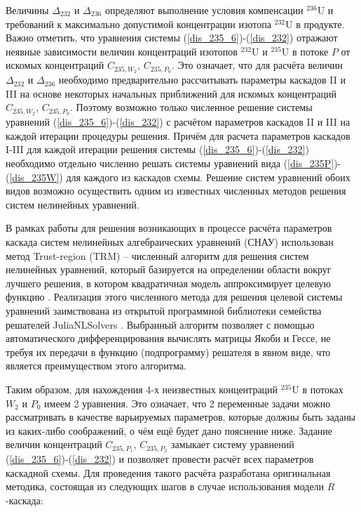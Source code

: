 Величины $\Delta_{232}$ и $\Delta_{236}$ определяют выполнение условия компенсации $^{236}$U и требований к максимально допустимой концентрации изотопа $^{232}$U в продукте. Важно отметить, что уравнения системы (\ref{dis_235_6})-(\ref{dis_232}) отражают неявные зависимости величин концентраций изотопов $^{232}$U и $^{235}$U в потоке $P$ от искомых концентраций $C_{235,{W_2}}$, $C_{235,{P_0}}$. Это означает, что для расчёта величин $\Delta_{232}$ и $\Delta_{236}$ необходимо предварительно рассчитывать параметры каскадов II и III на основе некоторых начальных приближений для искомых концентраций $C_{235,{W_2}}$, $C_{235,{P_0}}$. Поэтому возможно только численное решение системы уравнений (\ref{dis_235_6})-(\ref{dis_232}) с расчётом параметров каскадов II и III на каждой итерации процедуры решения. Причём для расчета параметров каскадов I-III для каждой итерации решения системы (\ref{dis_235_6})-(\ref{dis_232}) необходимо отдельно численно решать системы уравнений вида (\ref{dis_235P})-(\ref{dis_235W}) для каждого из каскадов схемы. Решение систем уравнений обоих видов возможно осуществить одним из известных численных методов решения систем нелинейных уравнений. 

В рамках работы для решения возникающих в процессе расчёта параметров каскада систем нелинейных алгебраических уравнений (СНАУ) использован метод Trust-region (TRM) -- численный алгоритм для решения систем нелинейных уравнений, который базируется на определении области вокруг лучшего решения, в котором квадратичная модель аппроксимирует целевую функцию \cite{NumericalOptimization2006}. Реализация этого численного метода для решения целевой системы уравнений заимствована из открытой программной библиотеки семейства решателей JuliaNLSolvers \cite{mogensenJuliaNLSolversNLsolveJl2020}. Выбранный алгоритм позволяет с помощью автоматического дифференцирования вычислять матрицы Якоби и Гессе, не требуя их передачи в функцию (подпрограмму) решателя в явном виде, что является преимуществом этого алгоритма.


Таким образом, для нахождения 4-х неизвестных концентраций $^{235}$U в потоках $W_2$ и $P_0$ имеем 2 уравнения. Это означает, что 2 переменные задачи можно рассматривать в качестве варьируемых параметров, которые должны быть заданы из каких-либо соображений, о чём ещё будет дано пояснение ниже. Задание величин концентраций $C_{235,{P_1}}$, $C_{235,{P_2}}$ замыкает систему уравнений (\ref{dis_235_6})-(\ref{dis_232}) и позволяет провести расчёт всех параметров каскадной схемы. Для проведения такого расчёта разработана оригинальная методика, состоящая из следующих шагов в случае использования модели $R$-каскада:


